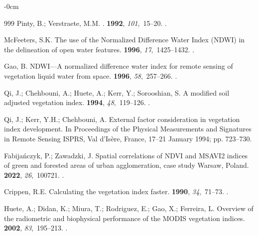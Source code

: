 \documentclass[jmse,article,accept,pdftex,moreauthors]{Definitions/mdpi}
\begin{document}
\begin{adjustwidth}{-\extralength}{0cm}
\begin{thebibliography}{999}
Pinty, B.; Verstraete, M.M.
.
 {\bf 1992}, {\em 101},~15--20.
.

McFeeters, S.K.
\newblock The use of the Normalized Difference Water Index (NDWI) in the
  delineation of open water features.
 {\bf 1996}, {\em 17},~1425--1432.
.

Gao, B.
\newblock NDWI—A normalized difference water index for remote sensing of
  vegetation liquid water from space.
 {\bf 1996}, {\em 58},~257--266.
.

Qi, J.; Chehbouni, A.; Huete, A.; Kerr, Y.; Sorooshian, S.
\newblock A modified soil adjusted vegetation index.
 {\bf 1994}, {\em 48},~119--126.
.

Qi, J.; Kerr, Y.H.; Chehbouni, A.
\newblock External factor consideration in vegetation index development.
\newblock In Proceedings of the Physical Measurements and
  Signatures in Remote Sensing ISPRS,  Val d'Isère, France, 17--21 January 1994; pp. 723--730. %

Fabijańczyk, P.; Zawadzki, J.
\newblock Spatial correlations of NDVI and MSAVI2 indices of green and forested
  areas of urban agglomeration, case study Warsaw, Poland.
 {\bf 2022}, {\em
  26},~100721.
.

Crippen, R.E.
\newblock Calculating the vegetation index faster.
 {\bf 1990}, {\em 34},~71--73.
.

Huete, A.; Didan, K.; Miura, T.; Rodriguez, E.; Gao, X.; Ferreira, L.
\newblock Overview of the radiometric and biophysical performance of the MODIS
  vegetation indices.
 {\bf 2002}, {\em 83},~195--213.
.


\end{thebibliography}
\end{adjustwidth}
\end{document}
